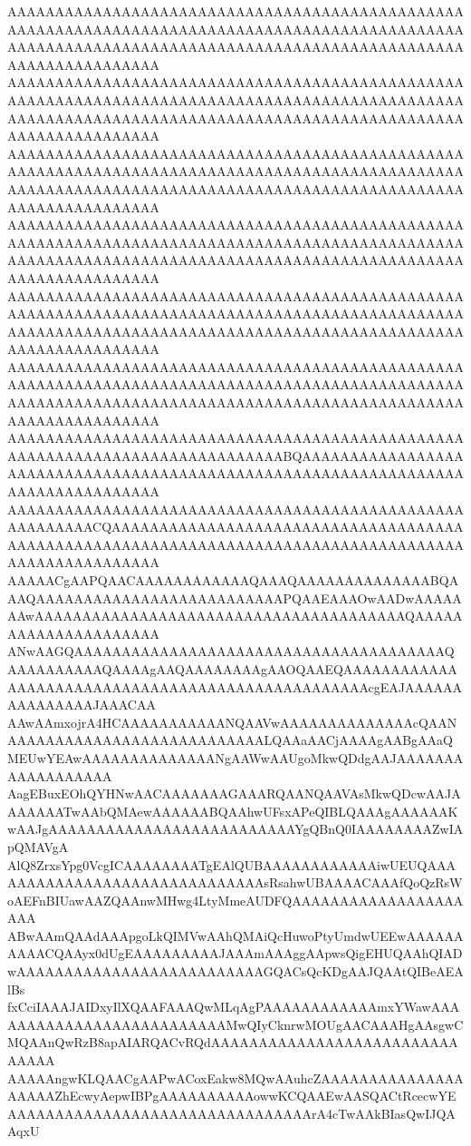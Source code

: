 \documentclass[multi=frame]{standalone}
\begin{document}
\begin{world}
        AAAAAAAAAAAAAAAAAAAAAAAAAAAAAAAAAAAAAAAAAAAAAAAAAAAAAAAAAAAAAAAAAAAAAAAAAAAAAAAAAAAAAAAAAAAAAAAAAAAAAAAAAAAAAAAAAAAAAAAAAAAAAAAAAAAAAAAAAAAAAAAAAAAAAAAAAAAAAAAA
        AAAAAAAAAAAAAAAAAAAAAAAAAAAAAAAAAAAAAAAAAAAAAAAAAAAAAAAAAAAAAAAAAAAAAAAAAAAAAAAAAAAAAAAAAAAAAAAAAAAAAAAAAAAAAAAAAAAAAAAAAAAAAAAAAAAAAAAAAAAAAAAAAAAAAAAAAAAAAAAA
        AAAAAAAAAAAAAAAAAAAAAAAAAAAAAAAAAAAAAAAAAAAAAAAAAAAAAAAAAAAAAAAAAAAAAAAAAAAAAAAAAAAAAAAAAAAAAAAAAAAAAAAAAAAAAAAAAAAAAAAAAAAAAAAAAAAAAAAAAAAAAAAAAAAAAAAAAAAAAAAA
        AAAAAAAAAAAAAAAAAAAAAAAAAAAAAAAAAAAAAAAAAAAAAAAAAAAAAAAAAAAAAAAAAAAAAAAAAAAAAAAAAAAAAAAAAAAAAAAAAAAAAAAAAAAAAAAAAAAAAAAAAAAAAAAAAAAAAAAAAAAAAAAAAAAAAAAAAAAAAAAA
        AAAAAAAAAAAAAAAAAAAAAAAAAAAAAAAAAAAAAAAAAAAAAAAAAAAAAAAAAAAAAAAAAAAAAAAAAAAAAAAAAAAAAAAAAAAAAAAAAAAAAAAAAAAAAAAAAAAAAAAAAAAAAAAAAAAAAAAAAAAAAAAAAAAAAAAAAAAAAAAA
        AAAAAAAAAAAAAAAAAAAAAAAAAAAAAAAAAAAAAAAAAAAAAAAAAAAAAAAAAAAAAAAAAAAAAAAAAAAAAAAAAAAAAAAAAAAAAAAAAAAAAAAAAAAAAAAAAAAAAAAAAAAAAAAAAAAAAAAAAAAAAAAAAAAAAAAAAAAAAAAA
        AAAAAAAAAAAAAAAAAAAAAAAAAAAAAAAAAAAAAAAAAAAAAAAAAAAAAAAAAAAAAAAAAAAAAAAAAAAAABQAAAAAAAAAAAAAAAAAAAAAAAAAAAAAAAAAAAAAAAAAAAAAAAAAAAAAAAAAAAAAAAAAAAAAAAAAAAAAAAAA
        AAAAAAAAAAAAAAAAAAAAAAAAAAAAAAAAAAAAAAAAAAAAAAAAAAAAAAAAACQAAAAAAAAAAAAAAAAAAAAAAAAAAAAAAAAAAAAAAAAAAAAAAAAAAAAAAAAAAAAAAAAAAAAAAAAAAAAAAAAAAAAAAAAAAAAAAAAAAAAA
        AAAAACgAAPQAACAAAAAAAAAAAAQAAAQAAAAAAAAAAAAAABQAAAQAAAAAAAAAAAAAAAAAAAAAAAAAAPQAAEAAAOwAADwAAAAAAAwAAAAAAAAAAAAAAAAAAAAAAAAAAAAAAAAAAAAAAAQAAAAAAAAAAAAAAAAAAAAA
        ANwAAGQAAAAAAAAAAAAAAAAAAAAAAAAAAAAAAAAAAAAAAAQAAAAAAAAAAQAAAAgAAQAAAAAAAAgAAOQAAEQAAAAAAAAAAAAAAAAAAAAAAAAAAAAAAAAAAAAAAAAAAAAAAAAAAcgEAJAAAAAAAAAAAAAAAJAAACAA
        AAwAAmxojrA4HCAAAAAAAAAAANQAAVwAAAAAAAAAAAAAAcQAANAAAAAAAAAAAAAAAAAAAAAAAAAAALQAAaAACjAAAAgAABgAAaQMEUwYEAwAAAAAAAAAAAAAANgAAWwAAUgoMkwQDdgAAJAAAAAAAAAAAAAAAAAA
        AagEBuxEOhQYHNwAACAAAAAAAGAAARQAANQAAVAsMkwQDcwAAJAAAAAAATwAAbQMAewAAAAAABQAAhwUFsxAPeQIBLQAAAgAAAAAAKwAAJgAAAAAAAAAAAAAAAAAAAAAAAAAAYgQBnQ0IAAAAAAAAZwIApQMAVgA
        AlQ8ZrxsYpg0VcgICAAAAAAAATgEAlQUBAAAAAAAAAAAAiwUEUQAAAAAAAAAAAAAAAAAAAAAAAAAAAAAAsRsahwUBAAAACAAAfQoQzRsWoAEFnBIUawAAZQAAnwMHwg4LtyMmeAUDFQAAAAAAAAAAAAAAAAAAAAA
        ABwAAmQAAdAAApgoLkQIMVwAAhQMAiQcHuwoPtyUmdwUEEwAAAAAAAAAACQAAyx0dUgEAAAAAAAAAJAAAmAAAggAApwsQigEHUQAAhQIADwAAAAAAAAAAAAAAAAAAAAAAAAAAGQACsQcKDgAAJQAAtQIBeAEAlBs
        fxCciIAAAJAIDxyIlXQAAFAAAQwMLqAgPAAAAAAAAAAAAmxYWawAAAAAAAAAAAAAAAAAAAAAAAAAAMwQIyCknrwMOUgAACAAAHgAAsgwCMQAAnQwRzB8apAIARQACvRQdAAAAAAAAAAAAAAAAAAAAAAAAAAAAAAA
        AAAAAngwKLQAACgAAPwACoxEakw8MQwAAuhcZAAAAAAAAAAAAAAAAAAAAZhEcwyAepwIBPgAAAAAAAAAAowwKCQAAEwAASQACtRcecwYEAAAAAAAAAAAAAAAAAAAAAAAAAAAAAAAArA4cTwAAkBIasQwIJQAAqxU

\end{world}
\end{document}
